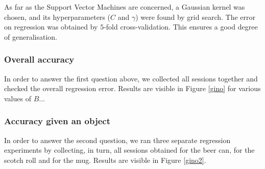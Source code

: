 As far as the Support Vector Machines are concerned, a Gaussian kernel
was chosen, and its hyperparameters ($C$ and $\gamma$) were found by
grid search. The error on regression was obtained by $5$-fold
cross-validation. This ensures a good degree of generalisation.

\subsubsection*{Overall accuracy}

In order to answer the first question above, we collected all sessions
together and checked the overall regression error. Results are visible
in Figure \ref{gino} for various values of $B$...

\subsubsection*{Accuracy given an object}

In order to answer the second question, we ran three separate
regression experiments by collecting, in turn, all sessions obtained
for the beer can, for the scotch roll and for the mug. Results are
visible in Figure \ref{gino2}.
